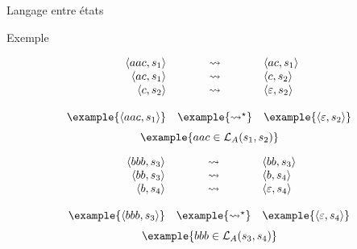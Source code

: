 \begin{frame}{Langage entre états}
\begin{exampleblock}{Exemple}
\begin{minipage}{.3\textwidth}
{}\end{minipage}%
    \begin{minipage}{.4\textwidth}
      $$\begin{array}{rcl}
        \langle aac, s_1 \rangle &\leadsto & \langle ac, s_1 \rangle\\
        \langle ac, s_1 \rangle &\leadsto & \langle c, s_2 \rangle\\
        \langle c, s_2 \rangle &\leadsto & \langle \varepsilon, s_2 \rangle\\
        \\
        \example{\langle aac, s_1 \rangle} & \example{\leadsto^\star} & \example{\langle \varepsilon, s_2 \rangle}
      \end{array}$$
      $$\example{aac \in \mathcal{L}_A(s_1, s_2)}$$
    \end{minipage}%
    \begin{minipage}{.3\textwidth}
      $$\begin{array}{rcl}
        \langle bbb, s_3 \rangle &\leadsto & \langle bb, s_3 \rangle\\
        \langle bb, s_3 \rangle &\leadsto & \langle b, s_4 \rangle\\
        \langle b, s_4 \rangle &\leadsto & \langle \varepsilon, s_4 \rangle\\
        \\
        \example{\langle bbb, s_3 \rangle} & \example{\leadsto^\star} & \example{\langle \varepsilon, s_4 \rangle}
      \end{array}$$
      $$\example{bbb \in \mathcal{L}_A(s_3, s_4)}$$
    \end{minipage}
  \end{exampleblock}
\end{frame}


\endgroup
